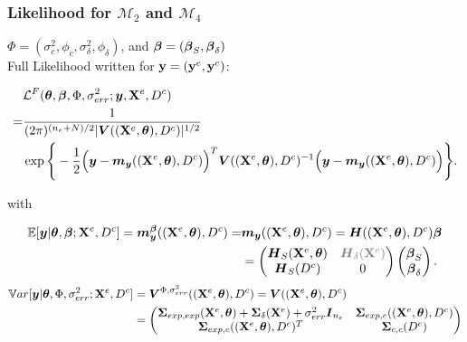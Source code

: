 \documentclass[nopagenumber,9pt]{beamer}
\begin{document}
\begin{frame}
 \frametitle{Likelihood for $\mathcal{M}_2$ and $\mathcal{M}_4$}

 $\Phi=(\sigma^2_c,\phi_c,\sigma^2_{\delta},\phi_\delta)$, and $\boldsymbol{\beta}=(\boldsymbol{\beta}_S,\boldsymbol{\beta}_\delta)$\\
 
 Full Likelihood written for $\mathbf{y}=(\mathbf{y}^e,\mathbf{y}^c)$:
 
 \begin{equation*}
\begin{split}
&\mathcal{L}^F(\boldsymbol{\theta},\boldsymbol{\beta},\Phi,\sigma_{err}^2;\boldsymbol{y},\mathbf{X}^e,D^c)\\=&\frac{1}{(2\pi)^{(n_e+N)/2}|\boldsymbol{V}((\mathbf{X}^e,\boldsymbol{\theta}),D^c)|^{1/2}}\\
&\exp\Bigg\{-\frac{1}{2}\Big(\boldsymbol{y}-\boldsymbol{m}_{\boldsymbol{y}}((\mathbf{X}^e,\boldsymbol{\theta}),D^c)\Big)^T
\boldsymbol{V}((\mathbf{X}^e,\boldsymbol{\theta}),D^c)^{-1}
\Big(\boldsymbol{y}-\boldsymbol{m}_{\boldsymbol{y}}((\mathbf{X}^e,\boldsymbol{\theta}),D^c)\Big)\Bigg\}.
\end{split}
\label{eq:FullLikelihood}
\end{equation*}

with 

 \begin{equation*}
\begin{split}
\mathbb{E}[\boldsymbol{y}|\btheta,\boldsymbol{\beta};\bXexp,\Dc]=\boldsymbol{m}_{\boldsymbol{y}}^{\boldsymbol{\beta}}((\bXexp,\btheta),\Dc) =& \boldsymbol{m}_{\boldsymbol{y}}((\bXexp,\btheta),\Dc) =\boldsymbol{H}((\bXexp,\btheta),\Dc)\boldsymbol{\beta}\\&=\begin{pmatrix}
\boldsymbol{H}_S(\bXexp,\btheta) & {\color{gray}\boldsymbol{H}_{\delta}(\bXexp)}\\
\boldsymbol{H}_S(\Dc) & 0
\end{pmatrix}\begin{pmatrix}
\bbeta_S \\ \bbeta_\delta
\end{pmatrix}
.
\end{split}
\label{eq:MeanFullLikelihood}
\end{equation*}
\begin{equation*}
\begin{split}
\mathbb{V}ar[\boldsymbol{y}|\boldsymbol{\theta},\Phi,\sigma_{err}^2;\mathbf{X}^e,D^c]&=\boldsymbol{V}^{\Phi,\sigma_{err}^2}((\mathbf{X}^e,\boldsymbol{\theta}),D^c)=\boldsymbol{V}((\mathbf{X}^e,\boldsymbol{\theta}),D^c)\\&=\begin{pmatrix}
 \boldsymbol{\Sigma}_{exp,exp}(\mathbf{X}^e,\boldsymbol{\theta}) +\boldsymbol{\Sigma}_{\delta}(\mathbf{X}^e) +\sigma_{err}^2\boldsymbol{I}_{n_e} &  \boldsymbol{\Sigma}_{exp,c}((\mathbf{X}^e,\boldsymbol{\theta}),D^c)\\
 \boldsymbol{\Sigma}_{exp,c}((\mathbf{X}^e,\boldsymbol{\theta}),D^c)^T & \boldsymbol{\Sigma}_{c,c}(D^c)
\end{pmatrix}
\end{split}
\label{eq:VarianceFullLikelihood}
\end{equation*}



\end{frame}
\end{document}
